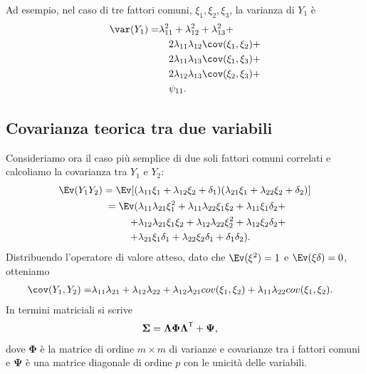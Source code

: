Ad esempio, nel caso di  tre fattori comuni, $\xi_1, \xi_2, \xi_3$, la varianza di $Y_1$ è
\begin{equation}
\begin{split}
\var(Y_1) = &\lambda_{11}^2 + \lambda_{12}^2 + \lambda_{13}^2 +\\ 
&\quad 2 \lambda_{11} \lambda_{12} \cov(\xi_1, \xi_2) + \\ 
&\quad 2 \lambda_{11} \lambda_{13} \cov(\xi_1, \xi_3) + \\ 
&\quad 2 \lambda_{12} \lambda_{13} \cov(\xi_2, \xi_3) + \\ 
&\quad \psi_{11}. \notag
\end{split}
\end{equation}


\subsection{Covarianza teorica tra due variabili}

Consideriamo ora il caso più semplice di due soli fattori comuni correlati e calcoliamo la covarianza tra $Y_1$ e $Y_2$:
\begin{align}
\Ev(Y_1 Y_2) =\Ev[(&\lambda_{11}\xi_1 + \lambda_{12}\xi_2+\delta_1) (\lambda_{21}\xi_1 + \lambda_{22}\xi_2+\delta_2)]\notag\\
=\Ev( 
&\lambda_{11}\lambda_{21}\xi_1^2 +
\lambda_{11}\lambda_{22}\xi_1\xi_2 +
\lambda_{11}\xi_1\delta_2 +\notag\\
+&\lambda_{12}\lambda_{21}\xi_1\xi_2 +
\lambda_{12}\lambda_{22}\xi_2^2 +
\lambda_{12}\xi_2\delta_2 +\notag\\
+&\lambda_{21}\xi_1\delta_1 +
\lambda_{22}\xi_2\delta_1 +
\delta_1\delta_2).\notag
\end{align}
Distribuendo l'operatore di valore atteso, dato che $\Ev(\xi^2)=1$ e $\Ev(\xi \delta)=0$, otteniamo
\begin{align}
\cov(Y_1, Y_2) = &\lambda_{11} \lambda_{21} + \lambda_{12} \lambda_{22} + 
\lambda_{12} \lambda_{21}cov(\xi_1, \xi_2) +\lambda_{11} \lambda_{22}cov(\xi_1, \xi_2). \notag
\end{align}
In termini matriciali si scrive
\begin{align}
\boldsymbol{\Sigma} &=\boldsymbol{\Lambda} \boldsymbol{\Phi} \boldsymbol{\Lambda}^{\ensuremath{\mathsf{T}}} + \boldsymbol{\Psi}, \notag
\end{align}
dove $\boldsymbol{\Phi}$ è la matrice di ordine $m \times m$ di varianze e covarianze tra i fattori comuni e $\boldsymbol{\Psi}$ è una matrice diagonale  di ordine $p$ con le unicità delle variabili. 


